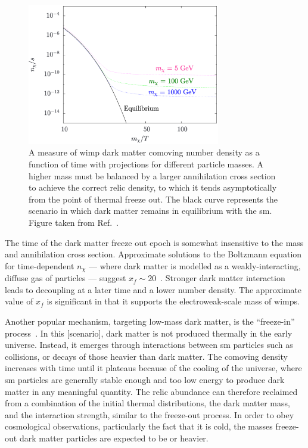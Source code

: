 \begin{figure}[htbp]
    \centering
    \includegraphics[width=0.75\textwidth]{figures/dm_abundance.png}
    \caption[A measure of \acrshort{wimp} dark matter comoving number density as a function of time with projections for different particle masses]{A measure of \acrshort{wimp} dark matter comoving number density as a function of time with projections for different particle masses. A higher mass must be balanced by a larger annihilation cross section to achieve the correct relic density, to which it tends asymptotically from the point of thermal freeze out. The black curve represents the scenario in which dark matter remains in equilibrium with the \acrlong{sm}. Figure taken from Ref.~.}
    \label{fig:theory_dm_abundance}
\end{figure}

The time of the dark matter freeze out epoch is somewhat insensitive to the mass and annihilation cross section. Approximate solutions to the Boltzmann equation for time-dependent $n_{\chi}$ --- where dark matter is modelled as a weakly-interacting, diffuse gas of particles --- suggest $x_f \sim 20$~\cite{Lisanti:2016jxe,Bender:2012gc}. Stronger dark matter interaction leads to decoupling at a later time and a lower number density. The approximate value of $x_f$ is significant in that it supports the electroweak-scale mass of \glspl{wimp}.

Another popular mechanism, targeting low-mass dark matter, is the ``freeze-in'' process~\cite{Hall:2009bx,Krnjaic:2017tio}. In this [scenario], dark matter is not produced thermally in the early universe. Instead, it emerges through interactions between \acrshort{sm} particles such as collisions, or decays of those heavier than dark matter. The comoving density increases with time until it plateaus because of the cooling of the universe, where \acrshort{sm} particles are generally stable enough and too low energy to produce dark matter in any meaningful quantity. The relic abundance can therefore reclaimed from a combination of the initial thermal distributions, the dark matter mass, and the interaction strength, similar to the freeze-out process. In order to obey cosmological observations, particularly the fact that it is cold, the masses freeze-out dark matter particles are expected to be  or heavier.

